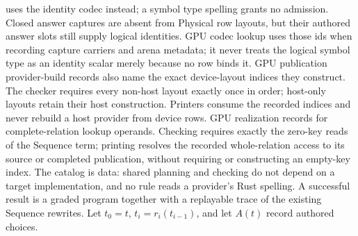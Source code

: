 uses the identity codec instead; a symbol type spelling grants no admission.
Closed answer captures are absent from Physical row layouts, but their
authored answer slots still supply logical identities. GPU codec lookup uses
those ids when recording capture carriers and arena metadata; it never treats
the logical symbol type as an identity scalar merely because no row binds it.
GPU publication provider-build records also name the exact device-layout
indices they construct. The checker requires every non-host layout exactly
once in order; host-only layouts retain their host construction. Printers
consume the recorded indices and never rebuild a host provider from device rows.
GPU realization records  for complete-relation lookup
operands. Checking requires exactly the zero-key reads of the Sequence term;
printing resolves the recorded whole-relation access to its source or completed
publication, without requiring or constructing an empty-key index.
The catalog is data: shared planning and checking
do not depend on a target implementation, and no rule reads a provider's Rust
spelling. A successful result is a graded
program together with a replayable trace of the existing Sequence rewrites.
Let $t_0=t$, $t_i=r_i(t_{i-1})$, and let $A(t)$ record authored choices.

